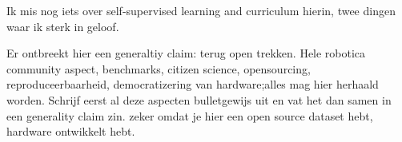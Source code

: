 \documentclass[\home/main.tex]{subfiles}
\begin{document}
Ik mis nog iets over self-supervised learning and curriculum hierin, twee dingen waar ik sterk in geloof.  

Er ontbreekt hier een generaltiy claim: terug open trekken. Hele robotica community aspect, benchmarks, citizen science, opensourcing, reproduceerbaarheid, democratizering van hardware;alles mag hier herhaald worden. Schrijf eerst al deze aspecten bulletgewijs uit en vat het dan samen in een generality claim zin. 
zeker omdat je hier een open source dataset hebt, hardware ontwikkelt hebt.  



\end{document}
